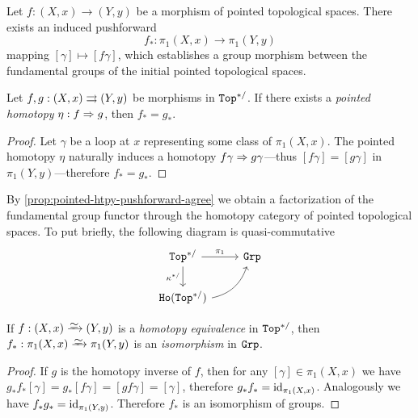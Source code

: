 \begin{definition}[Pushforwards in \(\pi_1\)]
\label{def:pushforward-pi1}
Let \(f: (X, x) \to (Y, y)\) be a morphism of pointed topological spaces. There
exists an induced pushforward
\[
f_{*}: \pi_1(X, x) \longrightarrow \pi_1(Y, y)
\]
mapping \([\gamma] \mapsto [f \gamma]\), which establishes a group morphism
between the fundamental groups of the initial pointed topological spaces.
\end{definition}

\begin{proposition}
\label{prop:pointed-htpy-pushforward-agree}
Let \(f, g: (X, x) \rightrightarrows (Y, y)\) be morphisms in \({\texttt{Top}^{*/}}\). If there exists a
\emph{pointed homotopy} \(\eta: f \Rightarrow g\), then \(f_{*} = g_{*}\).
\end{proposition}

\begin{proof}
Let \(\gamma\) be a loop at \(x\) representing some class of \(\pi_1(X,
x)\). The pointed homotopy \(\eta\) naturally induces a homotopy
\(f \gamma \Rightarrow g \gamma\)---thus \([f \gamma] = [g \gamma]\) in
\(\pi_1(Y, y)\)---therefore \(f_{*} = g_{*}\).
\end{proof}

By \cref{prop:pointed-htpy-pushforward-agree} we obtain a factorization of the
fundamental group functor through the homotopy category of pointed topological
spaces. To put briefly, the following diagram is quasi-commutative
\[
\begin{tikzcd}
\bpTop \ar[r, "\pi_1"] \ar[d, "\kappa^{*/}"'] &\Grp \\
\Ho{\bpTop} \ar[ru, bend right]
\end{tikzcd}
\]

\begin{corollary}
\label{cor:pushforward-preserve-isomorphism}
If \(f: (X, x) \isoto (Y, y)\) is a \emph{homotopy equivalence} in \({\texttt{Top}^{*/}}\),
then \(f_{*}: \pi_1(X, x) \isoto \pi_1(Y, y)\) is an \emph{isomorphism} in
\({\texttt{Grp}}\).
\end{corollary}

\begin{proof}
If \(g\) is the homotopy inverse of \(f\), then for any
\([\gamma] \in \pi_1(X, x)\) we have
\(g_{*}f_{*} [\gamma] = g_{*}[f \gamma] = [g f \gamma] = [\gamma]\), therefore
\(g_{*} f_{*} = \operatorname{id}_{\pi_1(X, x)}\). Analogously we have
\(f_{*} g_{*} = \operatorname{id}_{\pi_1(Y, y)}\). Therefore \(f_{*}\) is an isomorphism of
groups.
\end{proof}

